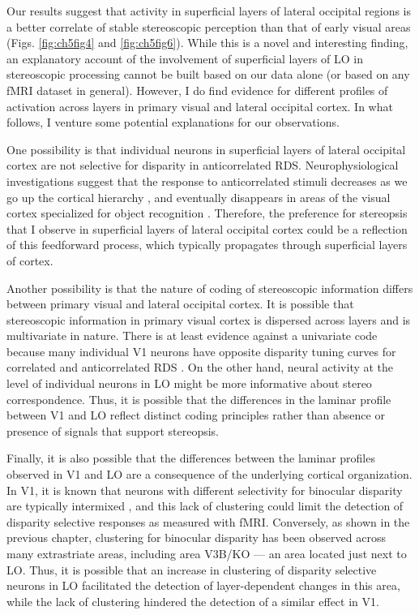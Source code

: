 Our results suggest that activity in superficial layers of lateral occipital regions is a better correlate of stable stereoscopic perception than that of early visual areas (Figs. \ref{fig:ch5fig4} and \ref{fig:ch5fig6}). While this is a novel and interesting finding, an explanatory account of the involvement of superficial layers of LO in stereoscopic processing cannot be built based on our data alone (or based on any fMRI dataset in general). However, I do find evidence for different profiles of activation across layers in primary visual and lateral occipital cortex. In what follows, I venture some potential explanations for our observations.

One possibility is that individual neurons in superficial layers of lateral occipital cortex are not selective for disparity in anticorrelated RDS. Neurophysiological investigations suggest that the response to anticorrelated stimuli decreases as we go up the cortical hierarchy \cite{Cumming:1997ve,Tanabe:2004mw}, and eventually disappears in areas of the visual cortex specialized for object recognition \cite{Janssen:2003fk}. Therefore, the preference for stereopsis that I observe in superficial layers of lateral occipital cortex could be a reflection of this feedforward process, which typically propagates through superficial layers of cortex.

Another possibility is that the nature of coding of stereoscopic information differs between primary visual and lateral occipital cortex. It is possible that stereoscopic information in primary visual cortex is dispersed across layers and is multivariate in nature. There is at least evidence against a univariate code because many individual V1 neurons have opposite disparity tuning curves for correlated and anticorrelated RDS \cite{Cumming:1997ve}. On the other hand, neural activity at the level of individual neurons in LO might be more informative about stereo correspondence. Thus, it is possible that the differences in the laminar profile between V1 and LO reflect distinct coding principles rather than absence or presence of signals that support stereopsis.

Finally, it is also possible that the differences between the laminar profiles observed in V1 and LO are a consequence of the underlying cortical organization. In V1, it is known that neurons with different selectivity for binocular disparity are typically intermixed \cite{Prince:2002cr}, and this lack of clustering could limit the detection of disparity selective responses as measured with fMRI. Conversely, as shown in the previous chapter, clustering for binocular disparity has been observed across many extrastriate areas, including area V3B/KO --- an area located just next to LO. Thus, it is possible that an increase in clustering of disparity selective neurons in LO facilitated the detection of layer-dependent changes in this area, while the lack of clustering hindered the detection of a similar effect in V1.




